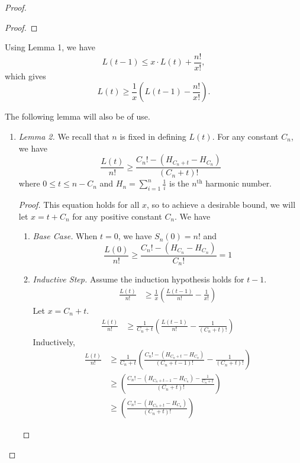 \documentclass[12pt, a4paper]{article}
\newcommand{\nth}{^{\text{th}}}       %
\begin{document}
\begin{proof}
\begin{enumerate}[label=]
\begin{proof}
			\end{proof}
		\end{enumerate}
		
		Using Lemma 1, we have
		\begin{equation*}
			L(t-1) \le x\cdot L(t) + \frac{n!}{x!},
		\end{equation*}
		which gives
		\begin{equation*}
			L(t)\ge \frac{1}{x}\left(L(t-1)-\frac{n!}{x!}\right).
		\end{equation*}
		
		The following lemma will also be of use.
		\begin{enumerate}[label=]
			\item\textit{Lemma 2.} We recall that $n$ is fixed in defining $L(t)$. For any constant $C_n$, we have
			\begin{equation*}
				\frac{L(t)}{n!}\ge \frac{C_{n}! - (H_{C_{n}+t} - H_{C_{n}})}{(C_n+t)!}
			\end{equation*}
			where $0\le t\le n-C_{n}$ and $H_n=\sum_{i = 1}^n\frac{1}{i}$ is the $n\nth$ harmonic number.
		\begin{proof}
			This equation holds for all $x$, so to achieve a desirable bound, we will
		let $x=t+C_{n}$ for any positive constant $C_{n}$. We have
		\begin{enumerate}[label=]
		\item\textit{Base Case.} When $t=0$, we have $S_n(0)= n!$ and
			\begin{equation*}
			\frac{L(0)}{n!}\ge \frac{C_{n}! - (H_{C_{n}}-H_{C_{n}})}{C_{n}!} = 1
			\end{equation*}
			
		\item \textit{Inductive Step.} Assume the induction hypothesis holds for $t-1$.
			\begin{align*}
			\frac{L(t)}{n!}
			& \ge \frac{1}{x}\left(\frac{L(t-1)}{n!}-\frac{1}{x!}\right)
			\end{align*}
		Let $x=C_{n}+t$.
			\begin{align*}
			\frac{L(t)}{n!}
			& \ge \frac{1}{C_{n}+t}\left(\frac{L(t-1)}{n!}
			-\frac{1}{(C_{n}+t)!}\right)
			\end{align*}
		Inductively,
			\begin{align*}
			\frac{L(t)}{n!}
			& \ge \frac{1}{C_{n}+t}\left(\frac{C_{n}!-(H_{C_{n}+t} - H_{C_{n}})}
			{(C_{n}+t-1)!} - \frac{1}{(C_{n}+t)!}\right)\\
			& \ge \left(\frac{C_{n}! - (H_{C_{n}+t-1} - H_{C_{n}}) - \frac{1}{C_{n}+t}}
			{(C_{n}+t)!}\right)\\
			& \ge \left(\frac{C_{n}! - (H_{C_{n}+t} - H_{C_{n}})}{(C_{n}+t)!}\right)
			\end{align*}
			

\end{enumerate}
\end{proof}
\end{enumerate}
\end{proof}
\end{document}
